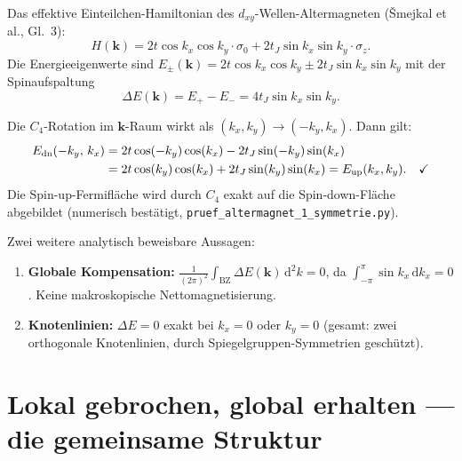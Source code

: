 Das effektive Einteilchen-Hamiltonian des $d_{xy}$-Wellen-Altermagneten
(Šmejkal et al., Gl.\ 3):
\begin{equation}
  H(\mathbf{k}) = 2t\cos k_x \cos k_y \cdot \sigma_0
    + 2t_J \sin k_x \sin k_y \cdot \sigma_z.
  \label{eq:alt_ham}
\end{equation}
Die Energieeigenwerte sind
$E_\pm(\mathbf{k}) = 2t\cos k_x \cos k_y \pm 2t_J \sin k_x \sin k_y$
mit der Spinaufspaltung
\begin{equation}
  \Delta E(\mathbf{k}) = E_+ - E_- = 4t_J \sin k_x \sin k_y.
  \label{eq:splitting}
\end{equation}

\begin{tcolorbox}[proofbox,title={Beweis: C$_4$ verbindet Spin-up mit Spin-down Fermifläche \B}]
Die $C_4$-Rotation im $\mathbf{k}$-Raum wirkt als
$(k_x, k_y) \to (-k_y, k_x)$. Dann gilt:
\begin{align}
  E_{\rm dn}(-k_y,\, k_x)
  &= 2t\cos(-k_y)\cos(k_x) - 2t_J\sin(-k_y)\sin(k_x) \notag\\
  &= 2t\cos(k_y)\cos(k_x) + 2t_J\sin(k_y)\sin(k_x)
   = E_{\rm up}(k_x, k_y). \quad\checkmark
\end{align}
Die Spin-up-Fermifläche wird durch $C_4$ exakt auf die Spin-down-Fläche
abgebildet (numerisch bestätigt, \texttt{pruef\_altermagnet\_1\_symmetrie.py}).
\end{tcolorbox}

Zwei weitere analytisch beweisbare Aussagen:

\begin{enumerate}
\item \textbf{Globale Kompensation:}
  $\displaystyle\frac{1}{(2\pi)^2}
  \int_{\mathrm{BZ}} \Delta E(\mathbf{k})\,\mathrm{d}^2k = 0$,
  da $\int_{-\pi}^{\pi}\sin k_x\,\mathrm{d}k_x = 0$.
  Keine makroskopische Nettomagnetisierung. \B

\item \textbf{Knotenlinien:}
  $\Delta E = 0$ exakt bei $k_x = 0$ oder $k_y = 0$ (gesamt:
  zwei orthogonale Knotenlinien, durch Spiegelgruppen-Symmetrien
  geschützt). \B
\end{enumerate}

\section{Lokal gebrochen, global erhalten — die gemeinsame Struktur}

